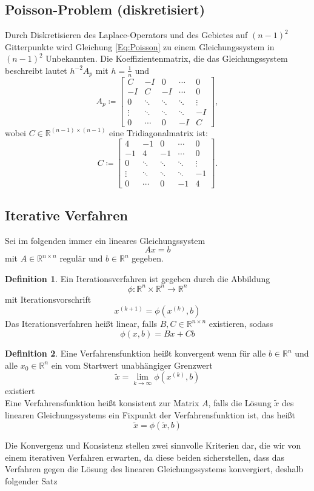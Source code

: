 \documentclass{scrartcl}
\newcommand\R{\mathbb{R}}
\theoremstyle{definition}
\newtheorem{definition}{Definition}
\begin{document}
\subsection{Poisson-Problem (diskretisiert)}
Durch Diskretisieren des Laplace-Operators und des Gebietes auf \((n-1)^2\) Gitterpunkte wird Gleichung \ref{Eq:Poisson} zu einem Gleichungssystem in \((n-1)^2\) Unbekannten. Die Koeffizientenmatrix, die das Gleichungssystem beschreibt lautet \(h^{-2}A_p\) mit \(h = \frac{1}{n}\) und
\[
    A_p \coloneq \begin{bmatrix}
        C      & -I     & 0      & \cdots & 0      \\
        -I     & C      & -I     & \cdots & 0      \\
        0      & \ddots & \ddots & \ddots & \vdots \\
        \vdots & \ddots & \ddots & \ddots & -I     \\
        0      & \cdots & 0      & -I     & C
    \end{bmatrix},
\]
wobei \(C \in \R^{(n-1) \times (n-1)}\) eine Tridiagonalmatrix ist:
\[
    C \coloneq \begin{bmatrix}
        4      & -1     & 0      & \cdots & 0      \\
        -1     & 4      & -1     & \cdots & 0      \\
        0      & \ddots & \ddots & \ddots & \vdots \\
        \vdots & \ddots & \ddots & \ddots & -1     \\
        0      & \cdots & 0      & -1     & 4
    \end{bmatrix}.
\]\cite{HandoutLU}

\subsection{Iterative Verfahren}
Sei im folgenden immer ein lineares Gleichungssystem
\[Ax=b\]
mit \(A \in \R^{n \times n}\) regulär und \(b \in \R^n\) gegeben.
\begin{definition}\cite{Iterative}
Ein Iterationsverfahren ist gegeben durch die Abbildung
\[\phi:\R^n \times \R^n \rightarrow \R^n\]
mit Iterationsvorschrift
\[x^{(k+1)}=\phi(x^{(k)},b)\]
Das Iterationsverfahren heißt linear, falls \(B,C \in \R^{n \times n}\) existieren, sodass
\[\phi(x,b)=Bx+Cb\]
\end{definition}


\begin{definition}\cite{Iterative}
Eine Verfahrensfunktion heißt konvergent wenn für alle \(b \in \R^n\) und alle \(x_0 \in \R^n\) ein vom Startwert unabhängiger Grenzwert
\[\tilde{x} = \lim_{k \to \infty} \phi(x^{(k)},b)\]
existiert\\
Eine Verfahrensfunktion heißt konsistent zur Matrix \(A\), falls die Lösung \(\tilde{x}\) des linearen Gleichungssystems ein Fixpunkt der Verfahrensfunktion ist, das heißt
\[\tilde{x} = \phi(\tilde{x},b)\]
\end{definition}
Die Konvergenz und Konsistenz stellen zwei sinnvolle Kriterien dar, die wir von einem iterativen Verfahren erwarten, da diese beiden sicherstellen, dass das Verfahren gegen die Lösung des linearen Gleichungssystems konvergiert, deshalb folgender Satz
\end{document}
